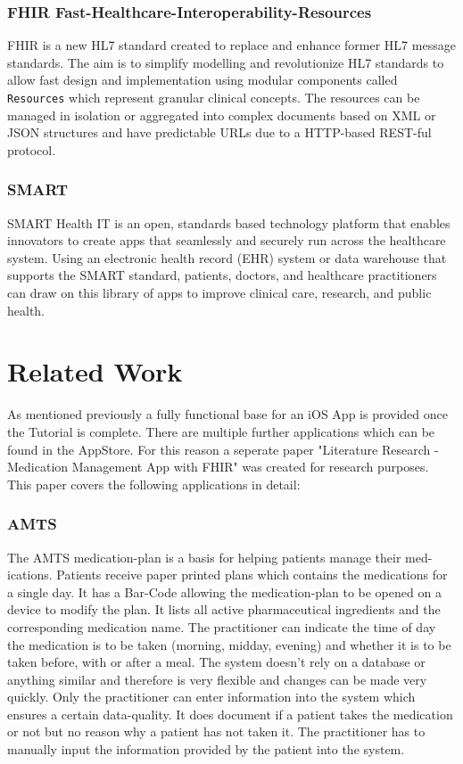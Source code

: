 \documentclass{article}
\begin{document}
\section{FHIR Fast-Healthcare-Interoperability-Resources}
FHIR \citep{02-fhir} is a new HL7 standard created to replace and enhance former HL7 message standards. The aim is to simplify modelling and revolutionize HL7 standards to allow fast design and implementation using modular components called \texttt{Resources} which represent granular clinical concepts. The resources can be managed in isolation or aggregated into complex documents based on XML or JSON structures and have predictable URLs due to a HTTP-based REST-ful protocol. \citep{03-fhir-wiki}

\section{SMART}
SMART Health IT is an open, standards based technology platform that enables innovators to create apps that seamlessly and securely run across the healthcare system. Using an electronic health record (EHR) system or data warehouse that supports the SMART standard, patients, doctors, and healthcare practitioners can draw on this library of apps to improve clinical care, research, and public health. \citep{04-smart}

\part{Related Work}
As mentioned previously a fully functional base for an iOS App is provided once the Tutorial is complete. There are multiple further applications which can be found in the AppStore. For this reason a seperate paper "Literature Research - Medication Management App with FHIR" was created for research purposes. This paper covers the following applications in detail:

\section{AMTS}
The AMTS\citep{05-amts} medication-plan is a basis for helping patients manage their med- ications. Patients receive paper printed plans which contains the medications for a single day. It has a Bar-Code allowing the medication-plan to be opened on a device to modify the plan.
It lists all active pharmaceutical ingredients and the corresponding medication name. The practitioner can indicate the time of day the medication is to be taken (morning, midday, evening) and whether it is to be taken before, with or after a meal.
The system doesn’t rely on a database or anything similar and therefore is very flexible and changes can be made very quickly. Only the practitioner can enter information into the system which ensures a certain data-quality.
It does document if a patient takes the medication or not but no reason why a patient has not taken it. The practitioner has to manually input the information provided by the patient into the system.
\end{document}
